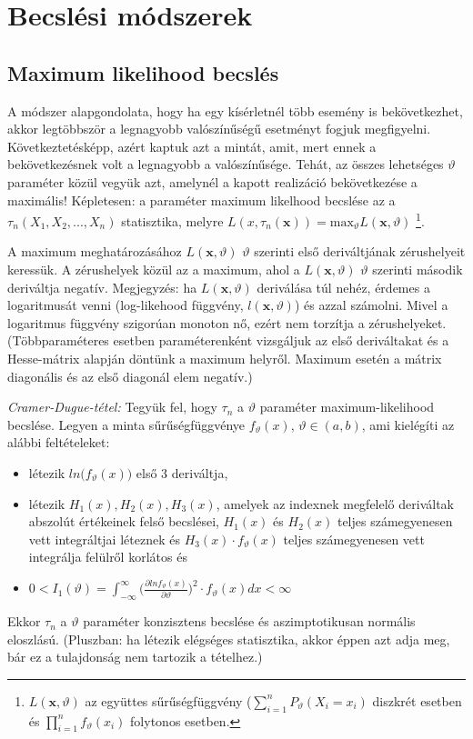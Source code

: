 \chapter{Becslési módszerek}

\section{Maximum likelihood becslés}

A módszer alapgondolata, hogy ha egy kísérletnél több esemény is bekövetkezhet, akkor legtöbbször a legnagyobb valószínűségű esetményt fogjuk megfigyelni. Következtetésképp, azért kaptuk azt a mintát, amit, mert ennek a bekövetkezésnek volt a legnagyobb a valószínűsége. Tehát, az összes lehetséges $\vartheta$ paraméter közül vegyük azt, amelynél a kapott realizáció bekövetkezése a maximális! Képletesen: a paraméter maximum likelhood becslése az a $\tau_n(X_1,X_2, ..., X_n)$ statisztika, melyre $L(x, \tau_n(\mathbf{x})) = \text{max}_\vartheta L(\mathbf{x}, \vartheta)
$ \footnote{$L(\mathbf{x}, \vartheta)$ az együttes sűrűségfüggvény ($\sum_{i=1}^nP_\vartheta(X_i=x_i)$ diszkrét esetben és $\prod_{i=1}^nf_\vartheta(x_i)$ folytonos esetben.}.

A maximum meghatározásához $L(\mathbf{x}, \vartheta)$ $\vartheta$ szerinti első deriváltjának zérushelyeit keressük. A zérushelyek közül az a maximum, ahol a $L(\mathbf{x}, \vartheta)$ $\vartheta$ szerinti második deriváltja negatív. Megjegyzés: ha $L(\mathbf{x}, \vartheta)$ deriválása túl nehéz, érdemes a logaritmusát venni (log-likehood függvény, $l(\mathbf{x}, \vartheta)$) és azzal számolni. Mivel a logaritmus függvény szigorúan monoton nő, ezért nem torzítja a zérushelyeket. (Többparaméteres esetben paraméterenként vizsgáljuk az első deriváltakat és a Hesse-mátrix alapján döntünk a maximum helyről. Maximum esetén a mátrix diagonális és az első diagonál elem negatív.)

\emph{Cramer-Dugue-tétel:} Tegyük fel, hogy $\tau_n$ a $\vartheta$ paraméter maximum-likelihood becslése. Legyen a minta sűrűségfüggvénye $f_\vartheta(x)$, $\vartheta \in (a,b)$, ami kielégíti az alábbi feltételeket:
\begin{itemize}
\item létezik $ln \big(f_\vartheta(x) \big)$ első 3 deriváltja,
\item létezik $H_1(x), H_2(x), H_3(x)$, amelyek az indexnek megfelelő deriváltak abszolút értékeinek felső becslései, $H_1(x)$ és $H_2(x)$ teljes számegyenesen vett integráltjai léteznek és $H_3(x) \cdot f_\vartheta(x)$ teljes számegyenesen vett integrálja felülről korlátos és
\item $0<I_1(\vartheta)=\int_{- \infty}^{\infty} \big(\frac{\partial ln f_\vartheta(x)}{\partial \vartheta}\big)^2 \cdot f_\vartheta(x) dx < \infty$
\end{itemize}
Ekkor $\tau_n$ a $\vartheta$ paraméter konzisztens becslése és aszimptotikusan normális eloszlású. (Pluszban: ha létezik elégséges statisztika, akkor éppen azt adja meg, bár ez a tulajdonság nem tartozik a tételhez.)

